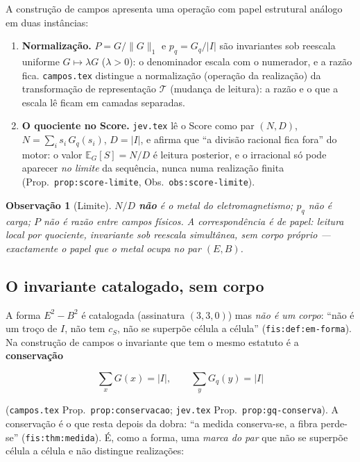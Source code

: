 \documentclass[11pt,a4paper]{article}
\newtheorem{observacao}{Observação}
\begin{document}
A construção de campos apresenta uma operação com papel estrutural análogo em
duas instâncias:

\begin{enumerate}[leftmargin=1.5em]
\item \textbf{Normalização.} $P=G/\lVert G\rVert_1$ e $p_q=G_q/|I|$ são
      invariantes sob reescala uniforme $G\mapsto\lambda G$ ($\lambda>0$): o
      denominador escala com o numerador, e a razão fica. \texttt{campos.tex}
      distingue a normalização (operação da realização) da transformação de
      representação $\mathcal T$ (mudança de leitura): a razão e o que a escala
      lê ficam em camadas separadas.
\item \textbf{O quociente no Score.} \texttt{jev.tex} lê o Score como par
      $(N,D)$, $N=\sum_i s_i\,G_q(s_i)$, $D=|I|$, e afirma que ``a divisão
      racional fica fora'' do motor: o valor $\mathbb E_G[S]=N/D$ é leitura
      posterior, e o irracional só pode aparecer \emph{no limite} da sequência,
      nunca numa realização finita (Prop.~\texttt{prop:score-limite},
      Obs.~\texttt{obs:score-limite}).
\end{enumerate}

\begin{observacao}[Limite]
\label{obs:limite-quociente}
$N/D$ \textbf{não} é o metal do eletromagnetismo; $p_q$ não é carga; $P$ não é
razão entre campos físicos. A correspondência é de \emph{papel}: leitura local
por quociente, invariante sob reescala simultânea, sem corpo próprio ---
exactamente o papel que o metal ocupa no par $(E,B)$.
\end{observacao}

\subsection{O invariante catalogado, sem corpo}

A forma $E^{2}-B^{2}$ é catalogada (assinatura $(3,3,0)$) mas \emph{não é um
corpo}: ``não é um troço de $I$, não tem $c_S$, não se superpõe célula a
célula'' (\texttt{fis:def:em-forma}). Na construção de campos o invariante que
tem o mesmo estatuto é a \textbf{conservação}

\[
\sum_x G(x)=|I|, \qquad \sum_y G_q(y)=|I|
\]

(\texttt{campos.tex} Prop.~\texttt{prop:conservacao}; \texttt{jev.tex}
Prop.~\texttt{prop:gq-conserva}). A conservação é o que resta depois da dobra:
``a medida conserva-se, a fibra perde-se'' (\texttt{fis:thm:medida}). É, como a
forma, uma \emph{marca do par} que não se superpõe célula a célula e não
distingue realizações:
\end{document}
